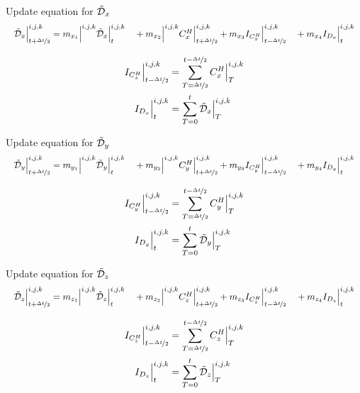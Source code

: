 \documentclass{beamer}
\begin{document}
\begin{frame}{Update equation for $\tilde{\mathcal{D}}_x$}
  \begin{align}
    \resizebox{\hsize}{!}{$
    \Dn_x\Big|_{t+\nicefrac{\dt}{2}}^{i,j,k} = \mxone\Big|^{i,j,k} \Dn_x\Big|_{t}^{i,j,k} 
    \quad + \mxtwo\Big|^{i,j,k}\CHx\Big|^{i,j,k}_{t+\dttwo} + \mxthree \ICHx\Big|^{i,j,k}_{t-\dttwo} 
    \quad + \mxfour \IDx\Big|^{i,j,k}_{t}
    $}
  \end{align}

  \begin{align}
    I_{C^H_x}\Big|^{i,j,k}_{t-\nicefrac{\Delta t}{2}} &= \sum\limits_{T=\nicefrac{\Delta t}{2}}^{t-\nicefrac{\Delta t}{2}}C_x^H\Big|^{i,j,k}_T
    \\
    I_{D_x}\Big|^{i,j,k}_{t} &= \sum\limits_{T=0}^{t} \tilde{\mathcal{D}}_x\Big|^{i,j,k}_T
  \end{align}

\end{frame}

\begin{frame}{Update equation for $\tilde{\mathcal{D}}_y$}
  \begin{align}
    \resizebox{\hsize}{!}{$
    \Dn_y\Big|_{t+\nicefrac{\dt}{2}}^{i,j,k} = \myone\Big|^{i,j,k} \Dn_y\Big|_{t}^{i,j,k} 
    \quad + \mytwo\Big|^{i,j,k}\CHy\Big|^{i,j,k}_{t+\dttwo} + \mythree \ICHy\Big|^{i,j,k}_{t-\dttwo} 
    \quad + \myfour \IDy\Big|^{i,j,k}_{t}
    $}
  \end{align}

  \begin{align}
    I_{C^H_y}\Big|^{i,j,k}_{t-\nicefrac{\Delta t}{2}} &= \sum\limits_{T=\nicefrac{\Delta t}{2}}^{t-\nicefrac{\Delta t}{2}}C_y^H\Big|^{i,j,k}_T
    \\
    I_{D_y}\Big|^{i,j,k}_{t} &= \sum\limits_{T=0}^{t} \tilde{\mathcal{D}}_y\Big|^{i,j,k}_T
  \end{align}

\end{frame}


\begin{frame}{Update equation for $\tilde{\mathcal{D}}_z$}
  \begin{align}
    \resizebox{\hsize}{!}{$
    \Dn_z\Big|_{t+\nicefrac{\dt}{2}}^{i,j,k} = \mzone\Big|^{i,j,k} \Dn_z\Big|_{t}^{i,j,k} 
    \quad + \mztwo\Big|^{i,j,k}\CHz\Big|^{i,j,k}_{t+\dttwo} + \mzthree \ICHz\Big|^{i,j,k}_{t-\dttwo} 
    \quad + \mzfour \IDz\Big|^{i,j,k}_{t}
    $}
  \end{align}

  \begin{align}
    I_{C^H_z}\Big|^{i,j,k}_{t-\nicefrac{\Delta t}{2}} &= \sum\limits_{T=\nicefrac{\Delta t}{2}}^{t-\nicefrac{\Delta t}{2}}C_z^H\Big|^{i,j,k}_T
    \\
    I_{D_z}\Big|^{i,j,k}_{t} &= \sum\limits_{T=0}^{t} \tilde{\mathcal{D}}_z\Big|^{i,j,k}_T
  \end{align}

\end{frame}
\end{document}
